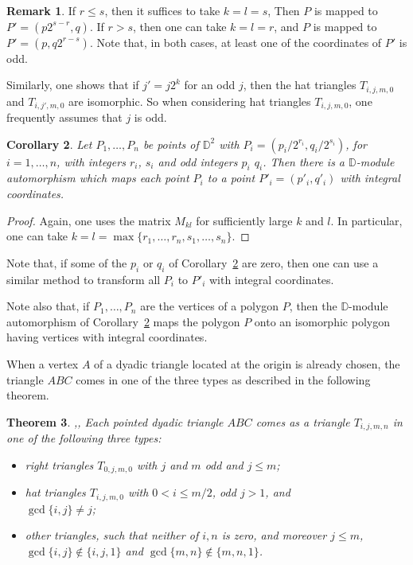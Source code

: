 \documentclass[12pt]{amsart}
\def\mbD{\mathbb{D}}
\theoremstyle{plain}
\newtheorem{theorem}{Theorem}[section]
\newtheorem{corollary}[theorem]{Corollary}
\theoremstyle{definition}
\newtheorem{remark}[theorem]{Remark}
\numberwithin{equation}{section}
\begin{document}
\begin{remark}\label{R:fracint}
If $r \leq s$, then it suffices to take $k = l = s$, Then $P$ is mapped to $P' = (p 2^{s-r}, q)$. If $r > s$, then one can take $k = l = r$, and $P$ is mapped to $P' = (p,q 2^{r-s})$. Note that, in both cases, at least one of the coordinates of $P'$ is odd.
\end{remark}


  Similarly, one shows that if $j' = j 2^k$ for an odd $j$,  then the hat triangles
$T_{i,j,m,0}$ and $T_{i,j',m,0}$ are isomorphic. So when considering hat triangles
$T_{i,j,m,0}$, one frequently assumes that $j$ is odd.



\begin{corollary}\label{C:fracint}
Let $P_1, \dots, P_n$ be points of $\mbD^2$ with $P_i =
({p_i}/{2^{r_i}},{q_i}/{2^{s_i}})$, for $i =1, \dots, n$, with integers $r_i$,
$s_i$ and odd integers $p_i$ $q_i$. Then there is a $\mbD$-module automorphism which maps
each point $P_i$ to a point $P'_i = (p'_i,q'_i)$ with integral coordinates.
\end{corollary}
\begin{proof}
Again, one uses the matrix $M_{kl}$ for sufficiently large $k$ and $l$. In particular, one can
take $k = l = \max\{r_1, \dots, r_n, s_1, \dots, s_n\}$.
\end{proof}


Note that, if some of the $p_i$ or $q_i$ of Corollary~\ref{C:fracint} are zero, then one can use a similar method to transform all $P_i$ to $P'_i$ with integral coordinates.

Note also that, if $P_1, \dots, P_n$ are the vertices of a polygon $P$, then the $\mbD$-module automorphism of Corollary~\ref{C:fracint} maps the polygon $P$ onto an isomorphic polygon having vertices with integral coordinates.

When a vertex $A$ of a dyadic triangle located at the origin is already chosen, the triangle
$ABC$ comes in one of the three types as described in the following theorem.


\begin{theorem}\cite[\S\S5--6]{MRS11},\cite[\S1]{MMR19a}, \cite[\S6]{MMR23}\label{T:classif}
Each pointed dyadic triangle $ABC$ comes as a triangle $T_{i,j,m,n}$  in one of the following
three types:
\begin{itemize}
\item[(a)] right triangles $T_{0,j,m,0}$ with $j$ and $m$ odd and $j \leq m$;
\item[(b)]  hat triangles $T_{i,j,m,0}$ with $0 < i \leq m/2$, odd $j > 1$, and\\ $\gcd\{i,
    j\} \neq  j$;
\item[(c)] other triangles, such that neither of $i, n$ is zero, and moreover $j \leq m$,
    $\gcd\{i, j\} \notin \{i, j, 1\}$ and $\gcd\{m, n\} \notin \{m, n,1\}$.
\end{itemize}
\end{theorem}
\end{document}
